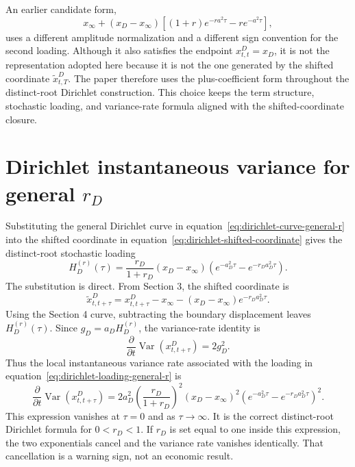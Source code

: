 \documentclass[11pt]{article}
\newcommand{\Var}{\operatorname{Var}}
\numberwithin{equation}{section}
\begin{document}
An earlier candidate form,
\begin{equation}
x_\infty+(x_D-x_\infty)\left[(1+r)e^{-ra^2\tau}-re^{-a^2\tau}\right],
\end{equation}
uses a different amplitude normalization and a different sign convention for the second loading. Although it also satisfies the endpoint $x^D_{t,t}=x_D$, it is not the representation adopted here because it is not the one generated by the shifted coordinate $\widetilde{x}^D_{t,T}$. The paper therefore uses the plus-coefficient form throughout the distinct-root Dirichlet construction. This choice keeps the term structure, stochastic loading, and variance-rate formula aligned with the shifted-coordinate closure.

\section{Dirichlet instantaneous variance for general \texorpdfstring{$r_D$}{rD}}

Substituting the general Dirichlet curve in equation~\eqref{eq:dirichlet-curve-general-r} into the shifted coordinate in equation~\eqref{eq:dirichlet-shifted-coordinate} gives the distinct-root stochastic loading
\begin{equation}
\label{eq:dirichlet-loading-general-r}
H_D^{(r)}(\tau)
=
\frac{r_D}{1+r_D}(x_D-x_\infty)
\left(e^{-a_D^2\tau}-e^{-r_Da_D^2\tau}\right).
\end{equation}
The substitution is direct. From Section 3, the shifted coordinate is
\begin{equation}
\widetilde{x}^D_{t,t+\tau}=x^D_{t,t+\tau}-x_\infty-(x_D-x_\infty)e^{-r_Da_D^2\tau}.
\end{equation}
Using the Section 4 curve, subtracting the boundary displacement leaves $H_D^{(r)}(\tau)$. Since $g_D=a_DH_D^{(r)}$, the variance-rate identity is
\begin{equation}
\frac{\partial}{\partial t}\Var(x^D_{t,t+\tau})=2g_D^2.
\end{equation}
Thus the local instantaneous variance rate associated with the loading in equation~\eqref{eq:dirichlet-loading-general-r} is
\begin{equation}
\frac{\partial}{\partial t}\Var(x^D_{t,t+\tau})
=
2a_D^2
\left(\frac{r_D}{1+r_D}\right)^2
(x_D-x_\infty)^2
\left(e^{-a_D^2\tau}-e^{-r_Da_D^2\tau}\right)^2.
\end{equation}
This expression vanishes at $\tau=0$ and as $\tau\to\infty$. It is the correct distinct-root Dirichlet formula for $0<r_D<1$. If $r_D$ is set equal to one inside this expression, the two exponentials cancel and the variance rate vanishes identically. That cancellation is a warning sign, not an economic result.
\end{document}
